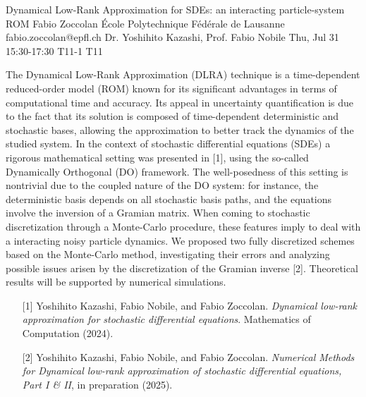 \begin{talk}
  {Dynamical Low-Rank Approximation for SDEs: an interacting particle-system ROM}%
  {Fabio Zoccolan}%
  {École Polytechnique Fédérale de Lausanne}%
  {fabio.zoccolan@epfl.ch}%
  {Dr. Yoshihito Kazashi, Prof. Fabio Nobile}%
  {}%
  {Thu, Jul 31 15:30-17:30}%
  {T11-1}%
  {T11}%
  
The Dynamical Low-Rank Approximation (DLRA) technique is a time-dependent reduced-order model (ROM) known for its significant advantages in terms of computational time and accuracy. Its appeal in uncertainty quantification is due to the fact that its solution is composed of time-dependent deterministic and stochastic bases, allowing the approximation to better track the dynamics of the studied system. In the context of stochastic differential equations (SDEs) a rigorous mathematical setting was presented in [1], using the so-called Dynamically Orthogonal (DO) framework. The well-posedness of this setting is nontrivial due to the coupled nature of the DO system: for instance, the deterministic basis depends on all stochastic basis paths, and the equations involve the inversion of a Gramian matrix. When coming to stochastic discretization through a Monte-Carlo procedure, these features imply to deal with a interacting noisy particle dynamics. We proposed two fully discretized schemes based on the Monte-Carlo method, investigating their errors and analyzing possible issues arisen by the discretization of the Gramian inverse [2]. Theoretical results will be supported by numerical simulations.

\medskip
\begin{enumerate}
	\item[{[1]}] Yoshihito Kazashi, Fabio Nobile, and Fabio Zoccolan. {\it Dynamical low-rank approximation for stochastic differential equations}. Mathematics of Computation (2024).
	\item[{[2]}] Yoshihito Kazashi, Fabio Nobile, and Fabio Zoccolan. {\it Numerical Methods for Dynamical low-rank approximation of stochastic differential equations, Part I \& II}, in preparation (2025).
\end{enumerate}

\end{talk}

